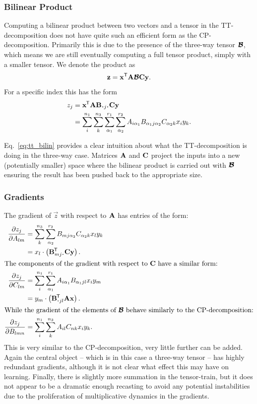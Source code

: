 {\subsubsection{Bilinear Product}
Computing a bilinear product between two vectors and a tensor in the TT-decomposition does not
have quite such an efficient form as the CP-decomposition. Primarily this is due to the presence
of the three-way tensor \(\bm{\mathcal{B}}\), which means we are still eventually computing a full
tensor product, simply with a smaller tensor. We denote the product as
\begin{equation} \label{eq:tt_bilin}
	\mathbf{z} = \mathbf{x}^\mathsf{T}\mathbf{A}\bm{\mathcal{B}}\mathbf{C}\mathbf{y}.
\end{equation} For a specific index this has the form
\begin{align} \label{eq:tt_bilin_index}
	z_j &= \tran{\vec{x}}\vec{A}\mat{B}_{\midbullet j \midbullet}\mat{C}\vec{y}\\
		&= \sum_{i}^{n_1}\sum_{k}^{n_3}
		\sum_{\alpha_1}^{r_1}
		\sum_{\alpha_2}^{r_2}A_{i\alpha_1}B_{\alpha_1j\alpha_2}C_{\alpha_2k}x_iy_k.
\end{align}

Eq.~\eqref{eq:tt_bilin} provides a clear intuition about what the TT-decomposition is doing in 
the three-way case.
Matrices \(\mathbf{A}\) and \(\mathbf{C}\) project the inputs into a new (potentially smaller) space
where the bilinear product is carried out with \(\bm{\mathcal{B}}\) ensuring the result has been pushed
back to the appropriate size.


\subsubsection{Gradients}
The gradient of \(\vec{z}\) with respect to \(\mathbf{A}\) has entries of the form:
\begin{align}
	\frac{\partial z_j}{\partial A_{lm}} 
	    &= \sum_{k}^{n_3}
		\sum_{\alpha_2}^{r_2}B_{m j\alpha_2}C_{\alpha_2k}x_ly_k\\
		&= x_l \cdot \left(\tran{\vec{B}_{mj\midbullet}}\mat{C}\vec{y}\right). \\
\intertext{The components of the gradient with respect to \(\mat{C}\) have a similar form:}
	\frac{\partial z_j}{\partial C_{lm}} 
		&= \sum_{i}^{n_1}
		\sum_{\alpha_1}^{r_1}A_{i\alpha_1}B_{\alpha_1jl}x_iy_m \\
		&= y_m \cdot \left(\tran{\vec{B}_{\midbullet jl}}\mat{A}\vec{x}\right). \\
\intertext{While the gradient of the elements of \(\tensor{B}\) behave similarly
	to the CP-decomposition:}
	\frac{\partial z_j}{\partial B_{lmn}} 
		&= \sum_{i}^{n_1}\sum_{k}^{n_3}
		A_{il}C_{nk}x_iy_k. \\
\end{align}
This is very similar to the CP-decomposition, very little further can be added. Again the central
object -- which is in this case a three-way tensor -- has highly redundant gradients, although it
is not clear what effect this may have on learning. Finally, there is slightly more summation
in the tensor-train, but it does not appear to be a dramatic enough recasting to avoid any
potential instabilities due to the proliferation of multiplicative dynamics in the gradients.


}
